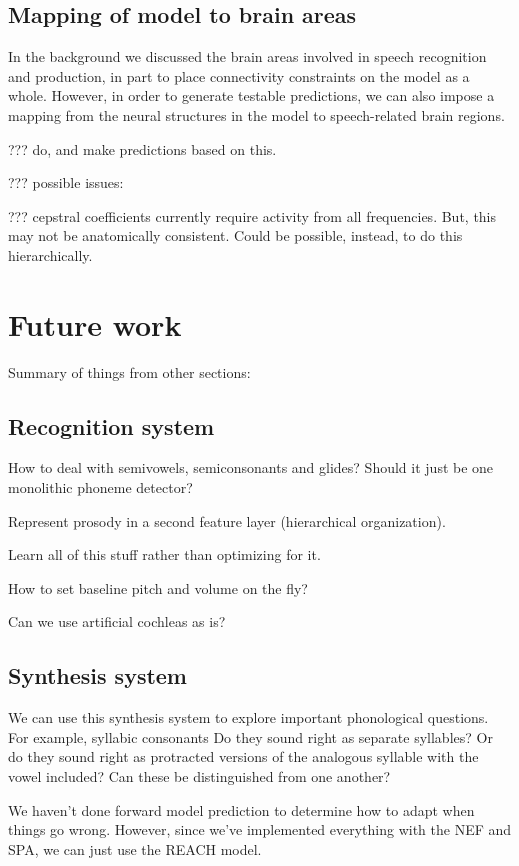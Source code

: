 \subsection{Mapping of model to brain areas}

In the background we discussed the brain areas
involved in speech recognition and production,
in part to place connectivity constraints
on the model as a whole.
However, in order to generate testable predictions,
we can also impose a mapping from
the neural structures in the model
to speech-related brain regions.

??? do, and make predictions based on this.

??? possible issues:

??? cepstral coefficients currently require activity
from all frequencies. But, this may not be anatomically
consistent. Could be possible, instead, to do this
hierarchically.

\section{Future work}

Summary of things from other sections:

\subsection{Recognition system}

How to deal with semivowels, semiconsonants and glides?
Should it just be one monolithic phoneme detector?

Represent prosody in a second feature layer (hierarchical organization).

Learn all of this stuff rather than optimizing for it.

How to set baseline pitch and volume on the fly?

Can we use artificial cochleas as is?

\subsection{Synthesis system}

We can use this synthesis system to explore
important phonological questions.
For example, syllabic consonants
Do they sound right as separate syllables?
Or do they sound right as protracted versions
of the analogous syllable with the vowel included?
Can these be distinguished from one another?

We haven't done forward model prediction
to determine how to adapt
when things go wrong.
However, since we've implemented everything
with the NEF and SPA,
we can just use the REACH model.

